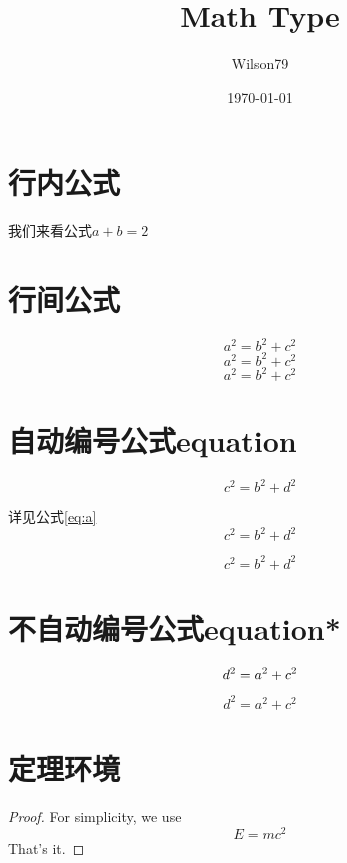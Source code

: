 \documentclass{article}
\title{Math Type}
\author{Wilson79}
\date{\today}
\begin{document}
 
	\tableofcontents %
	\maketitle %

	\section{行内公式} %

	我们来看公式$a+b=2$ %

    \section{行间公式}

	\[a^2 = b ^2 + c^2 \] %
	$$a^2 = b ^2 + c^2$$
	\begin{displaymath}
	a^2 = b ^2 + c^2
	\end{displaymath}

	\section{自动编号公式equation}
	\begin{equation} %
	 c^2 = b ^2 + d^2 
	\end{equation}

	详见公式\ref{eq:a}
	\begin{equation} 
	c^2 = b ^2 + d^2 \label{eq:a}
	\end{equation}

	\begin{equation} 
	 c^2 = b ^2 + d^2 \tag{*} 
	\end{equation}

	\section{不自动编号公式equation*}	
	\begin{equation}
	d^2 = a ^2 + c^2 \notag
	\end{equation}
	
	\begin{equation*}
	d^2 = a ^2 + c^2 
	\end{equation*}

	\section{定理环境}
	\begin{proof}
	For simplicity, we use
	\[
	E=mc^2
	\]
	That's it.
	\end{proof}
\end{document}
